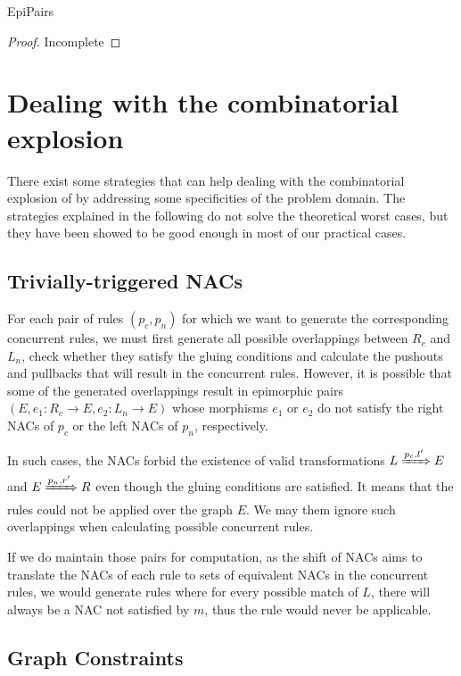 \begin{thm}{EpiPairs}
  \begin{proof}{Incomplete}
  \end{proof}
\end{thm}

\section{Dealing with the combinatorial explosion}\label{sec:explosion}

There exist some strategies that can help dealing with the combinatorial explosion of by addressing some specificities of the problem domain. The strategies explained in the following do not solve the theoretical worst cases, but they have been showed to be good enough in most of our practical cases.

\subsection{Trivially-triggered NACs}

For each pair of rules $(p_c,p_n)$ for which we want to generate the corresponding concurrent rules, we must first generate all possible overlappings between $R_c$ and $L_n$, check whether they satisfy the gluing conditions and calculate the pushouts and pullbacks that will result in the concurrent rules. However, it is possible that some of the generated overlappings result in epimorphic pairs $(E, e_1 : R_c \rightarrow E, e_2 : L_n \rightarrow E)$ whose morphisms $e_1$ or $e_2$ do not satisfy
the right NACs of $p_c$ or the left NACs of $p_n$, respectively.

In such cases, the NACs forbid the existence of valid transformations \mbox{$L \xRightarrow{p_c,l'} E$} and $E \xRightarrow{p_n,r'} R$ even though the gluing conditions are satisfied. It means that the rules could not be applied over the graph $E$. We may them ignore such overlappings when calculating possible concurrent rules.

If we do maintain those pairs for computation, as the shift of NACs aims to translate the NACs of each rule to sets of equivalent NACs in the concurrent rules, we would generate rules where for every possible match of $L$, there will always be a NAC not satisfied by $m$, thus the rule would never be applicable.

\subsection{Graph Constraints}\label{sec:constraints}


